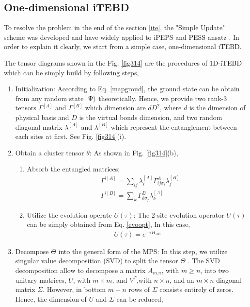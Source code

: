 \subsection{One-dimensional iTEBD}
To resolve the problem in the end of the section \ref{ite}, the "Simple Update" scheme was developed and have widely applied to iPEPS \cite{} and PESS ansatz \cite{}. In order to explain it clearly, we start from a simple case, one-dimensional iTEBD. 

The tensor diagrams shown in the Fig. \ref{fig314} are the procedures of 1D-iTEBD which can be simply build by following steps,
\begin{enumerate}
	\item Initialization: According to Eq. \ref{mapgroud}, the ground state can be obtain from any random state $\Ket{\Psi}$ theoretically. Hence, we provide two rank-3 tensors $\Gamma^{[A]}$ and $\Gamma^{[B]}$ which dimension are $dD^2$, where $d$ is the dimension of physical basis and $D$ is the virtual bonds dimension, and two random diagonal matrix $\lambda^{[A]}$ and $\lambda^{[B]}$ which represent the entanglement between each sites at first. See Fig. \ref{fig314}(i).
	\item Obtain a cluster tensor $\theta$: As shown in Fig. \ref{fig314}(b),
		\begin{enumerate}
			\item Absorb the entangled matrices; 
				\begin{align}
					&\Gamma^{\prime [A]} = \sum_{ij}{\lambda^{[A]}_{i} \Gamma^{A}_{ij \sigma_i} \lambda^{[B]}_{j}} \\
					&\Gamma^{\prime [B]} = \sum_{k}{\Gamma^{B}_{k \sigma_j} \lambda^{[A]}_{k}}
				\end{align}
			\item Utilize the evolution operate $U(\tau)$: The 2-site evolution operator $U(\tau)$ can be simply obtained from Eq. \ref{evoopt}, In this case, 
				\begin{align}
					U(\tau) = e^{-\tau H_{AB}}
				\end{align}
		\end{enumerate}
	\item Decompose $\Theta$ into the general form of the MPS: In this step, we utilize singular value decomposition (SVD) to split the tensor $\Theta$ . The SVD decomposition allow to decompose a matrix $A_{m.n}$, with $m \geq n$, into two unitary matrices, $U$, with $m \times m$, and $V^{T}$,with $n \times n$, and an $m \times n$ diagonal matrix $\Sigma$. However, in bottom $m - n$ rows of $\Sigma$ consists entirely of zeros. Hence, the dimension of $U$ and $\Sigma$ can be reduced,

\end{enumerate}
